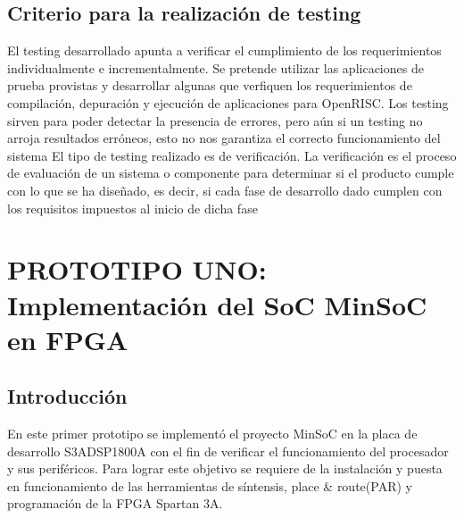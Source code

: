 		\subsection{Criterio para la realización de testing}%
		El testing desarrollado apunta a verificar el cumplimiento de los requerimientos individualmente e incrementalmente. Se pretende utilizar las
		aplicaciones de prueba provistas y desarrollar algunas que verfiquen los requerimientos de compilación, depuración y ejecución de aplicaciones para
		OpenRISC. 
Los testing sirven para poder detectar la presencia de errores, pero aún si un testing no arroja resultados erróneos, esto no nos garantiza el correcto funcionamiento del sistema 
El tipo de testing realizado es de verificación. La verificación es el proceso de evaluación de un sistema o componente para determinar si el producto cumple con lo que se ha diseñado, es decir, si cada fase de desarrollo dado cumplen con los requisitos impuestos al inicio de dicha fase

\newpage
	\section{PROTOTIPO UNO: Implementación del SoC MinSoC en FPGA}
		\subsection{Introducción}
		
	En este primer prototipo se implementó el proyecto MinSoC en la placa de desarrollo S3ADSP1800A con el fin de verificar el funcionamiento del procesador y sus periféricos. Para lograr este objetivo se requiere de la instalación y puesta en funcionamiento de las herramientas de síntensis, place \& route(PAR) y programación de la FPGA Spartan 3A. 

